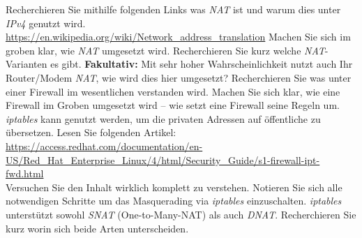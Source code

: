 \documentclass[paper=a4,fontsize=11pt]{scrartcl}%
\numberwithin{equation}{section}
\begin{document}
\begin{enumerate}
\begin{tasks}
		\task Recherchieren Sie mithilfe folgenden Links was \emph{NAT} ist und warum dies unter \emph{IPv4} genutzt wird.\\
		\url{https://en.wikipedia.org/wiki/Network_address_translation}
		\task Machen Sie sich im groben klar, wie \emph{NAT} umgesetzt wird.
		\task Recherchieren Sie kurz welche \emph{NAT}-Varianten es gibt. 
		\task \textbf{Fakultativ:} Mit sehr hoher Wahrscheinlichkeit nutzt auch Ihr Router/Modem \emph{NAT}, wie wird dies hier umgesetzt?
		\task Recherchieren Sie was unter einer Firewall im wesentlichen verstanden wird.
		\task Machen Sie sich klar, wie eine Firewall im Groben umgesetzt wird -- wie setzt eine Firewall seine Regeln um.
		\task \emph{iptables} kann genutzt werden, um die privaten Adressen auf öffentliche zu übersetzen. Lesen Sie folgenden Artikel:\\
		\url{https://access.redhat.com/documentation/en-US/Red_Hat_Enterprise_Linux/4/html/Security_Guide/s1-firewall-ipt-fwd.html}\\
		Versuchen Sie den Inhalt wirklich komplett zu verstehen. Notieren Sie sich alle notwendigen Schritte um das Masquerading via \emph{iptables} einzuschalten.
		\task \emph{iptables} unterstützt sowohl \emph{SNAT} (One-to-Many-NAT) als auch \emph{DNAT}. Recherchieren Sie kurz worin sich beide Arten unterscheiden.
	\end{tasks}
\end{enumerate}
\end{document}
